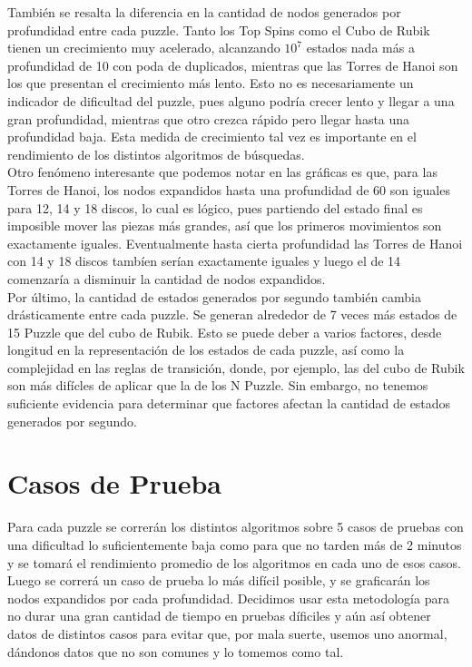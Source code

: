 \documentclass[a4paper,10pt]{article}
\begin{document}
    Tambi\'en se resalta la diferencia en la cantidad de nodos generados por
    profundidad entre cada puzzle. Tanto los Top Spins como el Cubo de Rubik tienen 
    un crecimiento muy acelerado, alcanzando $10^7$ estados nada m\'as a profundidad
    de 10 con poda de duplicados, mientras que las Torres de Hanoi son los que 
    presentan el crecimiento m\'as lento. Esto no es necesariamente un indicador 
    de dificultad del puzzle, pues alguno podr\'ia crecer lento y llegar a una 
    gran profundidad, mientras que otro crezca r\'apido pero llegar hasta una 
    profundidad baja. Esta medida de crecimiento tal vez es importante 
    en el rendimiento de los distintos algoritmos de b\'usquedas.\\
    
    Otro fen\'omeno interesante que podemos notar en las gr\'aficas es que, para las 
    Torres de Hanoi, los nodos expandidos hasta una profundidad de 60 son iguales 
    para 12, 14 y 18 discos, lo cual es l\'ogico, pues partiendo del estado final
    es imposible mover las piezas m\'as grandes, as\'i que los primeros movimientos
    son exactamente iguales. Eventualmente hasta cierta profundidad las Torres de 
    Hanoi con 14 y 18 discos tamb\'ien ser\'ian exactamente iguales y luego el de 
    14 comenzar\'ia a disminuir la cantidad de nodos expandidos.\\
    
    Por \'ultimo, la cantidad de estados generados por segundo tambi\'en
    cambia dr\'asticamente entre cada puzzle. Se generan alrededor de 7 veces m\'as 
    estados de 15 Puzzle que del cubo de Rubik. Esto se puede deber a varios factores,
    desde longitud en la representaci\'on de los estados de cada puzzle, as\'i como
    la complejidad en las reglas de transici\'on, donde, por ejemplo, las del cubo 
    de Rubik son m\'as dif\'icles de aplicar que la de los N Puzzle. Sin embargo, 
    no tenemos suficiente evidencia para determinar que factores afectan la cantidad
    de estados generados por segundo.
    
    
\section{Casos de Prueba}
  Para cada puzzle se correr\'an los distintos algoritmos sobre 5 casos de pruebas
  con una dificultad lo suficientemente baja como para que no tarden m\'as de 2 
  minutos y se tomar\'a el rendimiento promedio de los algoritmos en cada 
  uno de esos casos. Luego se correr\'a un caso de prueba lo m\'as dif\'icil posible,
  y se graficar\'an los nodos expandidos por cada profundidad. Decidimos usar esta 
  metodolog\'ia para no durar una gran cantidad de tiempo en pruebas d\'ificiles
  y a\'un as\'i obtener datos de distintos casos para evitar que, por mala suerte, 
  usemos uno anormal, d\'andonos datos que no son comunes y lo tomemos como tal.\\
  
\end{document}
